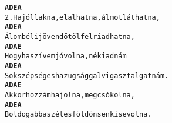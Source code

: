 \cleardoublepage
{}
\kottastart
{}
\kottaend
\begin{minipage}{\textwidth}
\begin{alltt}
\textbf{    A           D          E            A}
2. Ha jóllakna, elalhatna, álmot láthatna,
\textbf{   A         D          E         A}
   Álombéli jövendőtől felriadhatna,
\textbf{    A             D         A   E}
   Hogyha szívem jó volna, néki adnám
\textbf{    A             D           E           A}
   Sok szépséges hazugsággal vigasztalgatnám.
\textbf{    A            D        A     E}
   Akkor hozzám hajolna, megcsókolna,
\textbf{    A            D            E           A}
   Boldogabb a széles földön senki se volna.
\end{alltt}
\vspace{0.0cm}
\versszakspacing
\end{minipage}
~\vspace{1.0cm}
\newline
